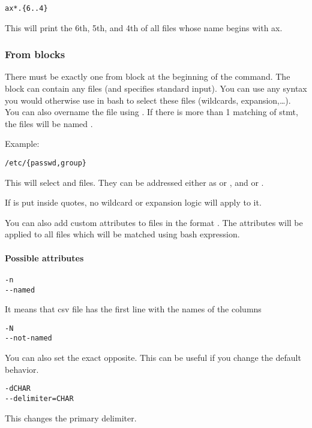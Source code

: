 \begin{verbatim}
ax*.{6..4}
\end{verbatim}
This will print the 6th, 5th, and 4th of all files whose name begins with ax.

\subsubsection{From blocks}
There must be exactly one from block at the beginning of the command. 
The block can contain any files (and \icode{-} specifies standard input). 
You can use any syntax you would otherwise use in bash to select these files (wildcards, expansion,\ldots)\break\cite{bash-reference-manual}. 
You can also overname the file using . If there is more than 1 matching of stmt, the files will be named .

Example:
\begin{verbatim}
/etc/{passwd,group}
\end{verbatim}

This will select  and  files. They can be addressed either as  or , and  or .

If  is put inside  quotes, no wildcard or expansion logic will apply to it.

You can also add custom attributes to files in the format \break {}. The attributes will be applied to all files which will be matched using  bash expression.

\paragraph{Possible attributes}

\begin{verbatim}
-n
--named
\end{verbatim}
It means that csv file has the first line with the names of the columns

\begin{verbatim}
-N
--not-named
\end{verbatim}
You can also set the exact opposite. This can be useful if you change the default behavior.

\begin{verbatim}
-dCHAR
--delimiter=CHAR
\end{verbatim}
This changes the primary delimiter.


